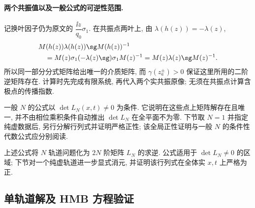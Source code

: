 \paragraph{两个共振值以及一般公式的可逆性范围.}
记换叶因子仍为原文的 $\dfrac{\ii z}{q_0}\sigma_1$.
在共振点两叶上, 由 $\lambda(h(z))=-\lambda(z)$,
\[
\begin{aligned}
&M(h(z))\lambda(h(z))\sg M(h(z))^{-1}\\
&\quad=M(z)\sigma_1(-\lambda(z)\sg)\sigma_1M(z)^{-1}
=M(z)\lambda(z)\sg M(z)^{-1}.
\end{aligned}
\]
所以同一部分分式矩阵给出唯一的介质矩阵,
而 $\gamma(z_a^\pm)>0$ 保证这里所用的二阶逆矩阵存在.
计算时先完成有限系统, 再代入两个实共振原像;
无须在共振点计算含极点的传播指数.

一般 $N$ 的公式以 $\det L_N(x,t)\ne0$ 为条件.
它说明在这些点上矩阵解存在且唯一,
并不由相位乘积条件自动推出 $\det L_N$ 在全平面不为零.
下节取 $N=1$ 并指定纯虚数据后,
另行分解行列式并证明严格正性;
该全局正性证明与一般 $N$ 的条件性代数公式应分别阅读.

上述公式将 $N$ 轨道问题化为 $2N$ 阶矩阵 $L_N$ 的求逆. 公式适用于 $\det L_N\ne0$ 的区域; 下节对一个纯虚轨道进一步显式消元, 并证明该行列式在全体实 $x,t$ 上严格为正.

\subsection{单轨道解及 HMB 方程验证}

